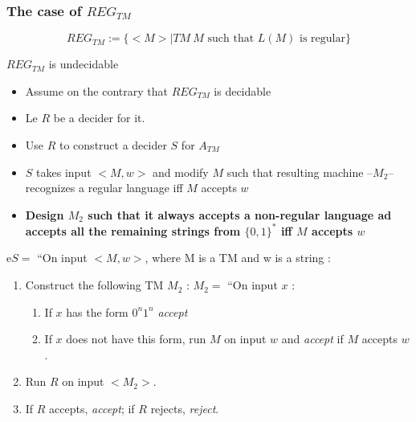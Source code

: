 \documentclass[12pt,a4paper]{article}
\newcommand{\atm}{\ensuremath{A_{TM}} }
\newcommand{\reg}{\ensuremath{REG_{TM}} }
\newcommand{\<}{\langle}
\renewcommand{\>}{\rangle}
\begin{document}
\subsubsection{The case of \reg}
\[\reg := \{<M> | TM\ M \text{ such that } L(M) \text{ is regular}\}\] 
\begin{boite}[0.6]
    \centering
     \reg is undecidable
\end{boite}
\begin{itemize}
    \item Assume on the contrary that \reg is decidable
    \item Le $R$ be a decider for it.
    \item Use $R$ to construct a decider $S$ for \atm
    \item $S$ takes input $<M,w>$ and modify $M$ such that resulting machine --$M_2$-- recognizes a regular language iff $M$ accepts $w$   
    \item \textbf{Design $M_2$ such that it always accepts a non-regular language ad accepts all the remaining strings from $\{0,1\}^*$ iff $M$ accepts $w$}
\end{itemize}
e$S =$ ``On input $<M,w>$, where M is a TM and w is a string :
\begin{enumerate}
    \item Construct the following TM $M_2$ : $M_2 =$ ``On input $x$ :
            \begin{enumerate}
                \item If $x$ has the form $0^n1^n$ \textit{accept}
                \item If $x$ does not have this form, run $M$ on input $w$ and \textit{accept} if $M$ accepts $w$.
            \end{enumerate}        
    \item Run $R$ on input $<M_2>$.
    \item If $R$ accepts, \textit{accept}; if $R$ rejects, \textit{reject}.
\end{enumerate}
\end{document}
